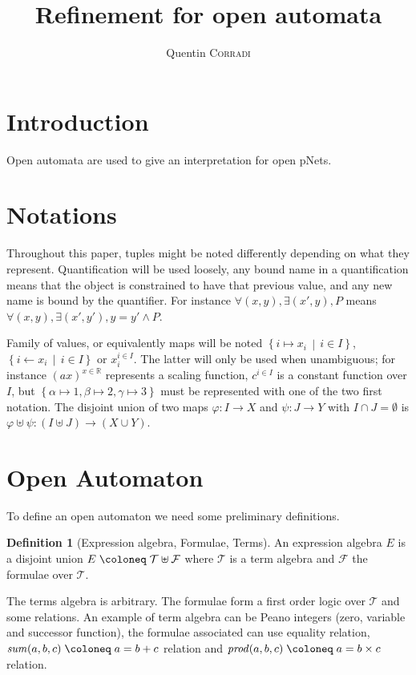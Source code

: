 \documentclass{article}
\title{Refinement for open automata}
\author{Quentin \textsc{Corradi}}
\theoremstyle{plain}
\theoremstyle{definition}
\newtheorem{defi}{Definition}
\newcommand\setR{\mathbb{R}}
\newcommand\mpar[1]{{\left(#1\right)}}
\newcommand\mbrc[1]{{\left\{#1\right\}}}
\newcommand\midbar{\,\middle|\,}
\newcommand\mset[2]{\mbrc{#1\midbar #2}}
\newcommand\defobject{\DOTSB\;{\coloneq}\;}
\newcommand\terms{{\mathcal{T}}}
\newcommand\formulae{{\mathcal{F}}}
\begin{document}
\maketitle


\section{Introduction}
Open automata are used to give an interpretation for open pNets.


\section{Notations}
Throughout this paper, tuples might be noted differently depending on what they represent.
Quantification will be used loosely, any bound name in a quantification means that the object is constrained to have that previous value, and any new name is bound by the quantifier.
For instance \(\forall \mpar{x, y}, \exists \mpar{x', y}, P\) means \(\forall \mpar{x, y}, \exists \mpar{x', y'}, y = y' \wedge P\).

Family of values, or equivalently maps will be noted \(\mset{i \mapsto x_i}{i \in I}\), \(\mset{i \gets x_i}{i \in I}\) or \(x_i^{i \in I}\).
The latter will only be used when unambiguous; for instance \(\mpar{ax}^{x \in \setR}\) represents a scaling function, \(c^{i \in I}\) is a constant function over \(I\), but \(\mbrc{\alpha \mapsto 1, \beta \mapsto 2, \gamma \mapsto 3}\) must be represented with one of the two first notation.
The disjoint union of two maps \(\varphi: I \to X\) and \(\psi: J \to Y\) with \(I \cap J = \emptyset\) is \(\varphi \uplus \psi: \mpar{I \uplus J} \to \mpar{X \cup Y}\).


\section{Open Automaton}
To define an open automaton we need some preliminary definitions.
\begin{defi}[Expression algebra, Formulae, Terms]
An expression algebra \(E\) is a disjoint union \(E \defobject \terms \uplus \formulae\) where \(\terms\) is a term algebra and \(\formulae\) the formulae over \(\terms\).
\end{defi}
The terms algebra is arbitrary.
The formulae form a first order logic over \(\terms\) and some relations.
An example of term algebra can be Peano integers (zero, variable and successor function), the formulae associated can use equality relation, \(\mathit{sum}\mpar{a, b, c} \defobject a = b + c\) relation and \(\mathit{prod}\mpar{a, b, c} \defobject a = b \times c\) relation.
\end{document}
